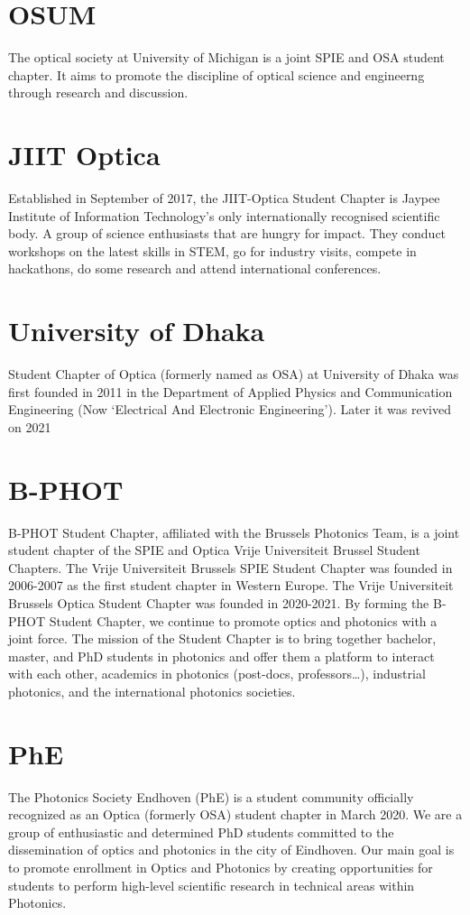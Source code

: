 \documentclass[10pt, a4paper, twocolumn]{article}
\begin{document}
    \section{OSUM}
    The optical society at University of Michigan is a joint SPIE and OSA student chapter.
    It aims to promote the discipline of optical science and engineerng through research and discussion.

    \section{JIIT Optica}
    Established in September of 2017, the JIIT-Optica Student Chapter is Jaypee Institute of Information Technology’s only internationally recognised scientific body.
    A group of science enthusiasts that are hungry for impact.
    They conduct workshops on the latest skills in STEM, go for industry visits, compete in hackathons, do some research and attend international conferences.

    \section{University of Dhaka}
    Student Chapter of Optica (formerly named as OSA) at University of Dhaka was first founded in 2011 in the Department of Applied Physics and Communication Engineering (Now ‘Electrical And Electronic Engineering’). Later it was revived on 2021

    \section{B-PHOT}
    B-PHOT Student Chapter, affiliated with the Brussels Photonics Team, is a joint student chapter of the SPIE and Optica Vrije Universiteit Brussel Student Chapters. The Vrije Universiteit Brussels SPIE Student Chapter was founded in 2006-2007 as the first student chapter in Western Europe. The Vrije Universiteit Brussels Optica Student Chapter was founded in 2020-2021. By forming the B-PHOT Student Chapter, we continue to promote optics and photonics with a joint force. The mission of the Student Chapter is to bring together bachelor, master, and PhD students in photonics and offer them a platform to interact with each other, academics in photonics (post-docs, professors…), industrial photonics, and the international photonics societies.

    \section{PhE}
    The Photonics Society Endhoven (PhE) is a student community officially recognized as an Optica (formerly OSA) student chapter in March 2020.
    We are a group of enthusiastic and determined PhD students committed to the dissemination of optics and photonics in the city of Eindhoven.
    Our main goal is to promote enrollment in Optics and Photonics by creating opportunities for students to perform high-level scientific research in technical areas within Photonics.
\end{document}
